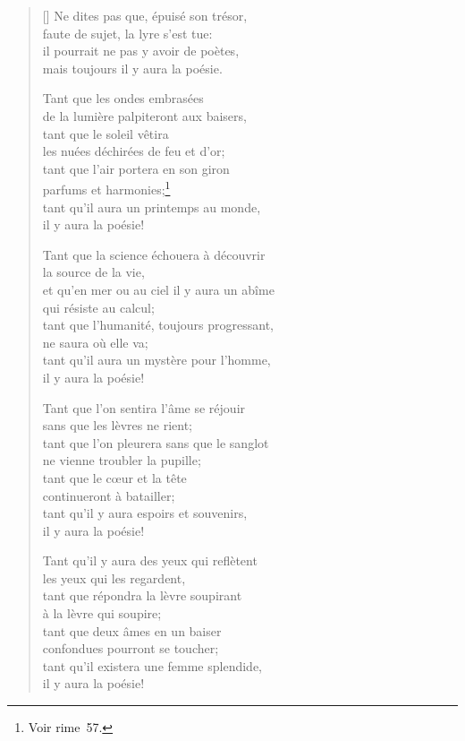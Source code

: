 \documentclass[a4paper,12pt]{book}
\begin{document}
\begin{verse}[\versewidth]
  Ne dites pas que, épuisé son trésor, \\
  faute de sujet, la lyre s'est tue: \\
  il pourrait ne pas y avoir de poètes, \\
  mais toujours il y aura la poésie.

  Tant que les ondes embrasées \\
  de la lumière palpiteront aux baisers, \\
  tant que le soleil vêtira \\
  les nuées déchirées de feu et d'or; \\
  tant que l'air portera en son giron \\
  parfums et harmonies;\footnote{Voir rime~57.} \\
  tant qu'il aura un printemps au monde, \\
  il y aura la poésie!

  Tant que la science échouera à découvrir \\
  la source de la vie, \\
  et qu'en mer ou au ciel il y aura un abîme \\
  qui résiste au calcul; \\
  tant que l'humanité, toujours progressant, \\
  ne saura où elle va; \\
  tant qu'il aura un mystère pour l'homme, \\
  il y aura la poésie!

  Tant que l'on sentira l'âme se réjouir \\
  sans que les lèvres ne rient; \\
  tant que l'on pleurera sans que le sanglot \\
  ne vienne troubler la pupille; \\
  tant que le cœur et la tête \\
  continueront à batailler; \\
  tant qu'il y aura espoirs et souvenirs, \\
  il y aura la poésie!

  Tant qu'il y aura des yeux qui reflètent \\
  les yeux qui les regardent, \\
  tant que répondra la lèvre soupirant \\
  à la lèvre qui soupire; \\
  tant que deux âmes en un baiser \\
  confondues pourront se toucher; \\
  tant qu'il existera une femme splendide, \\
  il y aura la poésie!
\end{verse}
\end{document}
